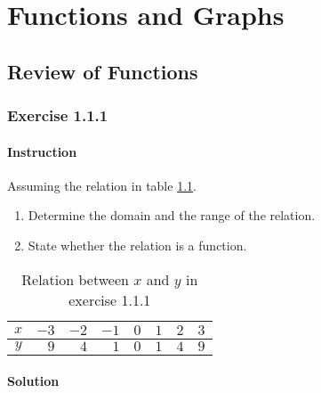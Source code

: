 \documentclass[11pt, letterpaper, oneside]{memoir}
\begin{document}
\tableofcontents

\chapter{Functions and Graphs}

\section{Review of Functions}








\subsection*{Exercise 1.1.1}

\subsubsection{Instruction}

Assuming the relation in table \ref{table:exercise-1.1.1}.
\begin{enumerate}[label=(\alph*)]
  \item Determine the domain and the range of the relation.
  \item State whether the relation is a function.
\end{enumerate}

\begin{table}[ht]
  \centering
  \begin{tabular}{ c | r r r r r r r }
    \hline
    $ x $ & $ -3 $ & $ -2 $ & $ -1 $ & $ 0 $ & $ 1 $ & $ 2 $ & $ 3 $ \\
    \hline
    $ y $ & $ 9 $ & $ 4 $ & $ 1 $ & $ 0 $ & $ 1 $ & $ 4 $ & $ 9 $ \\
    \hline
  \end{tabular}
  \caption{Relation between $ x $ and $ y $ in exercise 1.1.1}
  \label{table:exercise-1.1.1}
\end{table}

\subsubsection{Solution}
\end{document}
